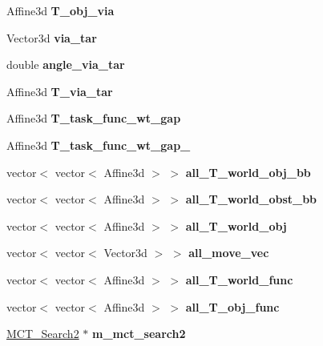 \begin{DoxyCompactItemize}
Affine3d {\bfseries T\+\_\+obj\+\_\+via}
\item 
\mbox{\label{classTool__Expt__2_af8d43750625b98a106c6606184ce522a}} 
Vector3d {\bfseries via\+\_\+tar}
\item 
\mbox{\label{classTool__Expt__2_aa39d0a14d97237c421cd049bebc358c4}} 
double {\bfseries angle\+\_\+via\+\_\+tar}
\item 
\mbox{\label{classTool__Expt__2_a3e286ff433b47843641bd659dee2afb0}} 
Affine3d {\bfseries T\+\_\+via\+\_\+tar}
\item 
\mbox{\label{classTool__Expt__2_a98ffffb3f89e1f64d964b8485ab213f8}} 
Affine3d {\bfseries T\+\_\+task\+\_\+func\+\_\+wt\+\_\+gap}
\item 
\mbox{\label{classTool__Expt__2_a0189882749568e8c1661bf31efbca1cc}} 
Affine3d {\bfseries T\+\_\+task\+\_\+func\+\_\+wt\+\_\+gap\+\_}
\item 
\mbox{\label{classTool__Expt__2_a64e1f0372fa2f43eb1fe1f48131d8904}} 
vector$<$ vector$<$ Affine3d $>$ $>$ {\bfseries all\+\_\+\+T\+\_\+world\+\_\+obj\+\_\+bb}
\item 
\mbox{\label{classTool__Expt__2_a0d73b60245a5ec480e482e8cd4165e55}} 
vector$<$ vector$<$ Affine3d $>$ $>$ {\bfseries all\+\_\+\+T\+\_\+world\+\_\+obst\+\_\+bb}
\item 
\mbox{\label{classTool__Expt__2_aec3e58756302427e7c854a314125d5a2}} 
vector$<$ vector$<$ Affine3d $>$ $>$ {\bfseries all\+\_\+\+T\+\_\+world\+\_\+obj}
\item 
\mbox{\label{classTool__Expt__2_ad5e05783f1b2c027108d734135b45a5a}} 
vector$<$ vector$<$ Vector3d $>$ $>$ {\bfseries all\+\_\+move\+\_\+vec}
\item 
\mbox{\label{classTool__Expt__2_a835dfdb9db3e97dbf80211a04bc8fe5b}} 
vector$<$ vector$<$ Affine3d $>$ $>$ {\bfseries all\+\_\+\+T\+\_\+world\+\_\+func}
\item 
\mbox{\label{classTool__Expt__2_a67e3bc6167b42e0cc706ca1f84ecc0cc}} 
vector$<$ vector$<$ Affine3d $>$ $>$ {\bfseries all\+\_\+\+T\+\_\+obj\+\_\+func}
\item 
\mbox{\label{classTool__Expt__2_ad30d37c86882819c277d363575555067}} 
\hyperlink{classMCT__Search2}{M\+C\+T\+\_\+\+Search2} $\ast$ {\bfseries m\+\_\+mct\+\_\+search2}
\end{DoxyCompactItemize}
